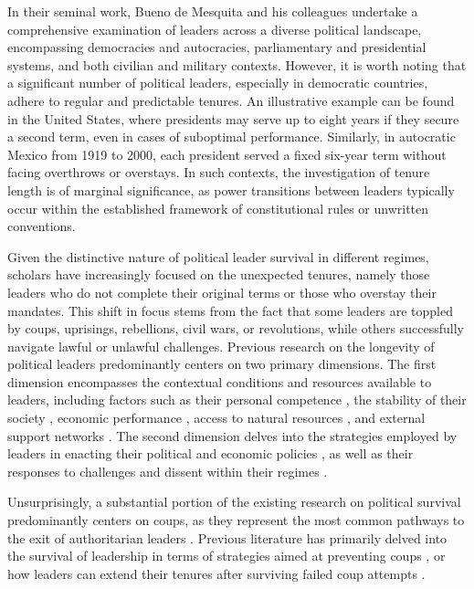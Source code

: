 \documentclass[
  12pt,
  a4paper,
  12pt]{article}
\begin{document}
In their seminal work, Bueno de Mesquita and his colleagues undertake a
comprehensive examination of leaders across a diverse political
landscape, encompassing democracies and autocracies, parliamentary and
presidential systems, and both civilian and military contexts. However,
it is worth noting that a significant number of political leaders,
especially in democratic countries, adhere to regular and predictable
tenures. An illustrative example can be found in the United States,
where presidents may serve up to eight years if they secure a second
term, even in cases of suboptimal performance. Similarly, in autocratic
Mexico from 1919 to 2000, each president served a fixed six-year term
without facing overthrows or overstays. In such contexts, the
investigation of tenure length is of marginal significance, as power
transitions between leaders typically occur within the established
framework of constitutional rules or unwritten conventions.

Given the distinctive nature of political leader survival in different
regimes, scholars have increasingly focused on the unexpected tenures,
namely those leaders who do not complete their original terms or those
who overstay their mandates. This shift in focus stems from the fact
that some leaders are toppled by coups, uprisings, rebellions, civil
wars, or revolutions, while others successfully navigate lawful or
unlawful challenges. Previous research on the longevity of political
leaders predominantly centers on two primary dimensions. The first
dimension encompasses the contextual conditions and resources available
to leaders, including factors such as their personal competence
\citep{yu2016}, the stability of their society \citep{arriola2009},
economic performance \citep[\citet{williams2011}]{palmer1999}, access to
natural resources \citep{smith2004, quirozflores2012}, and external
support networks \citep[\citet{thyne2017}]{licht2009, wright2008}. The
second dimension delves into the strategies employed by leaders in
enacting their political and economic policies
\citep{gandhi2007, morrison2009}, as well as their responses to
challenges and dissent within their regimes
\citep{escribà-folch2013, davenport2021}.

Unsurprisingly, a substantial portion of the existing research on
political survival predominantly centers on coups, as they represent the
most common pathways to the exit of authoritarian leaders
\citep{svolik2008, frantz2016}. Previous literature has primarily delved
into the survival of leadership in terms of strategies aimed at
preventing coups \citep{powell2017, sudduth2017, debruin2020}, or how
leaders can extend their tenures after surviving failed coup attempts
\citep{easton2018}.
\end{document}
